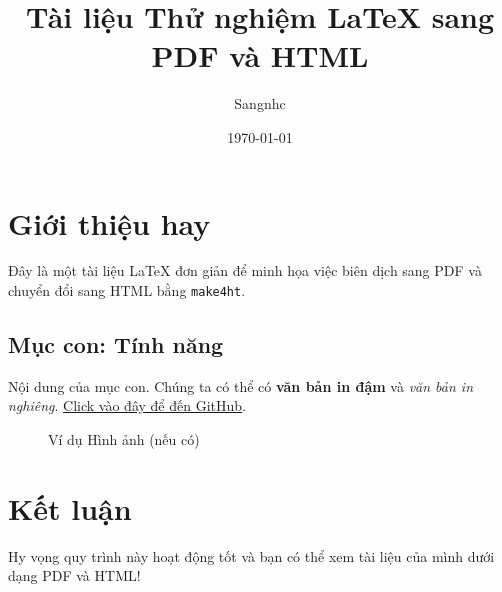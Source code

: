 \documentclass{article}
\title{Tài liệu Thử nghiệm LaTeX sang PDF và HTML}
\author{Sangnhc}
\date{\today}
\begin{document}
\maketitle

\section{Giới thiệu hay}
Đây là một tài liệu LaTeX đơn giản để minh họa việc biên dịch sang PDF và chuyển đổi sang HTML bằng \texttt{make4ht}.

\subsection{Mục con: Tính năng}
Nội dung của mục con. Chúng ta có thể có \textbf{văn bản in đậm} và \textit{văn bản in nghiêng}.
\href{https://github.com}{Click vào đây để đến GitHub}.

\begin{figure}[H]
    \centering
    \caption{Ví dụ Hình ảnh (nếu có)}
    \label{fig:example}
\end{figure}

\section{Kết luận}
Hy vọng quy trình này hoạt động tốt và bạn có thể xem tài liệu của mình dưới dạng PDF và HTML!
\end{document}
